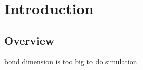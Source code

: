 \chapter{Introduction}
\label{chapter:Introduction}

\section{Overview}
\label{overview}
	bond dimension is too big to do simulation.


